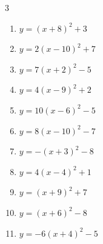 \begin{multicols}{3}
\begin{enumerate}
  \item $\displaystyle y=\left( x+8\right)^{2}+3$

        \phantom{$\displaystyle 頂点\left( -8 , 3 \right)$}

  \item $\displaystyle y=2\left( x-10\right)^{2}+7$

        \phantom{$\displaystyle 頂点\left( 10 , 7 \right)$}

  \item $\displaystyle y=7\left( x+2\right)^{2}-5$

        \phantom{$\displaystyle 頂点\left( -2 , -5 \right)$}

  \item $\displaystyle y=4\left( x-9\right)^{2}+2$

        \phantom{$\displaystyle 頂点\left( 9 , 2 \right)$}

  \item $\displaystyle y=10\left( x-6\right)^{2}-5$

        \phantom{$\displaystyle 頂点\left( 6 , -5 \right)$}

  \item $\displaystyle y=8\left( x-10\right)^{2}-7$

        \phantom{$\displaystyle 頂点\left( 10 , -7 \right)$}

\columnbreak %

  \item $\displaystyle y=-\left( x+3\right)^{2}-8$

        \phantom{$\displaystyle 頂点\left( -3 , -8 \right)$}

  \item $\displaystyle y=4\left( x-4\right)^{2}+1$

        \phantom{$\displaystyle 頂点\left( 4 , 1 \right)$}

  \item $\displaystyle y=\left( x+9\right)^{2}+7$

        \phantom{$\displaystyle 頂点\left( -9 , 7 \right)$}

  \item $\displaystyle y=\left( x+6\right)^{2}-8$

        \phantom{$\displaystyle 頂点\left( -6 , -8 \right)$}

  \item $\displaystyle y=-6\left( x+4\right)^{2}-5$

        \phantom{$\displaystyle 頂点\left( -4 , -5 \right)$}


\end{enumerate}
\end{multicols}
